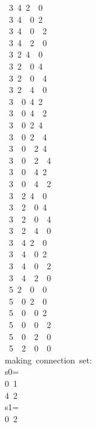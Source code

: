 \begin{tabbing}
\ 3\ 4\ 2\ \ 0\ \\[0pt]
\ 3\ 4\ \ 0\ 2\ \\[0pt]
\ 3\ 4\ \ 0\ \ 2\ \\[0pt]
\ 3\ 4\ \ 2\ \ 0\ \\[0pt]
\ 3\ 2\ 4\ \ 0\ \\[0pt]
\ 3\ 2\ \ 0\ 4\ \\[0pt]
\ 3\ 2\ \ 0\ \ 4\ \\[0pt]
\ 3\ 2\ \ 4\ \ 0\ \\[0pt]
\ 3\ \ 0\ 4\ 2\ \\[0pt]
\ 3\ \ 0\ 4\ \ 2\ \\[0pt]
\ 3\ \ 0\ 2\ 4\ \\[0pt]
\ 3\ \ 0\ 2\ \ 4\ \\[0pt]
\ 3\ \ 0\ \ 2\ 4\ \\[0pt]
\ 3\ \ 0\ \ 2\ \ 4\ \\[0pt]
\ 3\ \ 0\ \ 4\ 2\ \\[0pt]
\ 3\ \ 0\ \ 4\ \ 2\ \\[0pt]
\ 3\ \ 2\ 4\ \ 0\ \\[0pt]
\ 3\ \ 2\ \ 0\ 4\ \\[0pt]
\ 3\ \ 2\ \ 0\ \ 4\ \\[0pt]
\ 3\ \ 2\ \ 4\ \ 0\ \\[0pt]
\ 3\ \ 4\ 2\ \ 0\ \\[0pt]
\ 3\ \ 4\ \ 0\ 2\ \\[0pt]
\ 3\ \ 4\ \ 0\ \ 2\ \\[0pt]
\ 3\ \ 4\ \ 2\ \ 0\ \\[0pt]
\ 5\ 2\ \ 0\ \ 0\ \\[0pt]
\ 5\ \ 0\ 2\ \ 0\ \\[0pt]
\ 5\ \ 0\ \ 0\ 2\ \\[0pt]
\ 5\ \ 0\ \ 0\ \ 2\ \\[0pt]
\ 5\ \ 0\ \ 2\ \ 0\ \\[0pt]
\ 5\ \ 2\ \ 0\ \ 0\ \\[0pt]
making\ connection\ set:\\[0pt]
s0=\\[0pt]
0\ 1\ \\[0pt]
4\ 2\ \\[0pt]
s1=\\[0pt]
0\ 2\ \\[0pt]

\end{tabbing}
